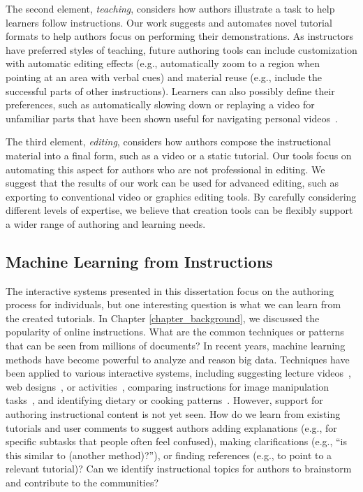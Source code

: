 The second element, \emph{teaching}, considers how authors illustrate a task to help learners follow instructions. Our work suggests and automates novel tutorial formats to help authors focus on performing their demonstrations. As instructors have preferred styles of teaching, future authoring tools can include customization with automatic editing effects (e.g., automatically zoom to a region when pointing at an area with verbal cues) and material reuse (e.g., include the successful parts of other instructions). Learners can also possibly define their preferences, such as automatically slowing down or replaying a video for unfamiliar parts that have been shown useful for navigating personal videos~\cite{Cheng:2009:SUV:1518701.1518823}.

The third element, \emph{editing}, considers how authors compose the instructional material into a final form, such as a video or a static tutorial. Our tools focus on automating this aspect for authors who are not professional in editing. We suggest that the results of our work can be used for advanced editing, such as exporting to conventional video or graphics editing tools.
%
By carefully considering different levels of expertise, we believe that creation tools can be flexibly support a wider range of authoring and learning needs.

\subsection{Machine Learning from Instructions}
The interactive systems presented in this dissertation focus on the authoring process for individuals, but one interesting question is what we can learn from the created tutorials. In Chapter \ref{chapter_background}, we discussed the popularity of online instructions. What are the common techniques or patterns that can be seen from millions of documents? In recent years, machine learning methods have become powerful to analyze and reason big data. Techniques have been applied to various interactive systems, including suggesting lecture videos~\cite{Kim:2014:DIT:2642918.2647389}, web designs~\cite{Kumar:2013:WDM:2470654.2466420}, or activities~\cite{Fast:2016:AMH:2858036.2858528}, comparing instructions for image manipulation tasks~\cite{Pavel:EECS-2013-167}, and identifying dietary or cooking patterns~\cite{IBMChefWatson,West:2013:CCI:2488388.2488510}. However, support for authoring instructional content is not yet seen. How do we learn from existing tutorials and user comments to suggest authors adding explanations (e.g., for specific subtasks that people often feel confused), making clarifications (e.g., ``is this similar to (another method)?''), or finding references (e.g., to point to a relevant tutorial)? Can we identify instructional topics for authors to brainstorm and contribute to the communities?

